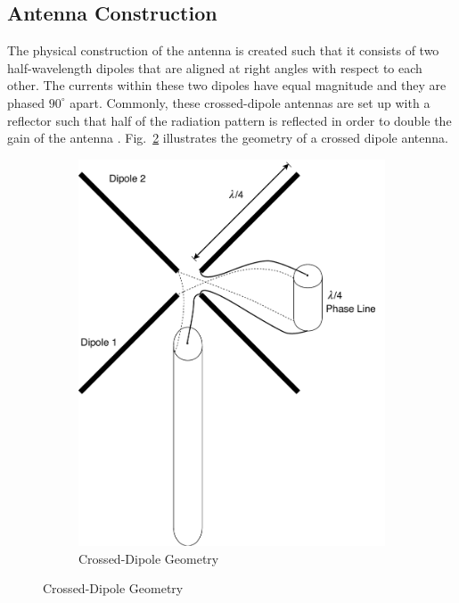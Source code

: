 \documentclass[11pt]{witseiepaper}
\begin{document}
\begin{bibunit}[witseie]
\subsection{Antenna Construction} \label{sec:AntennaConstruction}
The physical construction of the antenna is created such that it consists of two half-wavelength dipoles that are aligned at right angles with respect to each other. The currents within these two dipoles have equal magnitude and they are phased $90^{\circ}$ apart.
Commonly, these crossed-dipole antennas are set up with a reflector such that half of the radiation pattern is reflected in order to double the gain of the antenna \cite[p.~108]{IEEECrossedDipole}.
Fig.~\ref{fig:Crossed-DipoleGeometry} illustrates the geometry of a crossed dipole antenna.
\begin{figure}[htb]
    \centering
    \begin{subfigure}{.3\textwidth}
        \centering
            \includegraphics[width=\textwidth]{Crossed-Dipole.pdf}
            \caption{Crossed-Dipole Geometry}
            \label{fig:Crossed-DipoleGeometry} 

\end{subfigure}
\end{figure}
\end{bibunit}
\end{document}
